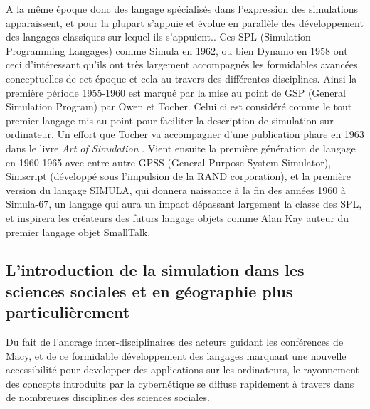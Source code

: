 A la même époque donc des langage spécialisés dans l'expression des simulations apparaissent, et pour la plupart  s'appuie et évolue en parallèle des développement des langages classiques sur lequel ils s'appuient.. Ces SPL (Simulation Programming Langages) comme Simula en 1962, ou bien Dynamo en 1958 ont ceci d'intéressant qu'ils ont très largement accompagnés les formidables avancées conceptuelles de cet époque et cela au travers des différentes disciplines. Ainsi la première période 1955-1960 est marqué par la mise au point de GSP (General Simulation Program) \autocite{Tocher1960} par Owen et Tocher. Celui ci est considéré comme le tout premier langage mis au point pour faciliter la description de simulation sur ordinateur. Un effort que Tocher va accompagner d'une publication phare en 1963 dans le livre \textit{Art of Simulation} \autocite{Tocher1963} . Vient ensuite la première génération de langage en 1960-1965 avec entre autre GPSS (General Purpose System Simulator), Simscript (développé sous l'impulsion de la RAND corporation), et la première version du langage SIMULA, qui donnera naissance à la fin des années 1960 à Simula-67, un langage qui aura un impact dépassant largement la classe des SPL, et inspirera les créateurs des futurs langage objets comme Alan Kay auteur du premier langage objet SmallTalk. 

\subsection{L'introduction de la simulation dans les sciences sociales et en géographie plus particulièrement}

Du fait de l'ancrage inter-disciplinaires des acteurs guidant les conférences de Macy, et de ce formidable développement des langages marquant une nouvelle accessibilité pour developper des applications sur les ordinateurs, le rayonnement des concepts introduits par la cybernétique se diffuse rapidement à travers dans de nombreuses disciplines des sciences sociales. 

